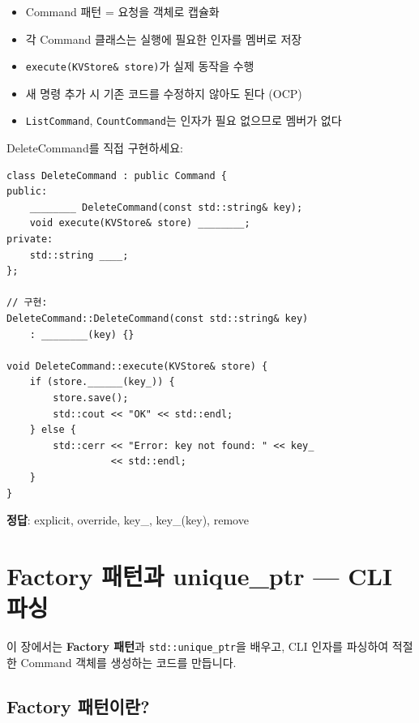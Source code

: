 \documentclass[11pt,a4paper]{book}
\newcommand{\code}[1]{\texttt{#1}}
\begin{document}
\begin{summarybox}
\begin{itemize}[nosep]
\item Command 패턴 = 요청을 객체로 캡슐화
\item 각 Command 클래스는 실행에 필요한 인자를 멤버로 저장
\item \code{execute(KVStore\& store)}가 실제 동작을 수행
\item 새 명령 추가 시 기존 코드를 수정하지 않아도 된다 (OCP)
\item \code{ListCommand}, \code{CountCommand}는 인자가 필요 없으므로 멤버가 없다
\end{itemize}
\end{summarybox}

\begin{quizbox}
DeleteCommand를 직접 구현하세요:

\begin{lstlisting}[style=cpp,numbers=none]
class DeleteCommand : public Command {
public:
    ________ DeleteCommand(const std::string& key);
    void execute(KVStore& store) ________;
private:
    std::string ____;
};

// 구현:
DeleteCommand::DeleteCommand(const std::string& key)
    : ________(key) {}

void DeleteCommand::execute(KVStore& store) {
    if (store.______(key_)) {
        store.save();
        std::cout << "OK" << std::endl;
    } else {
        std::cerr << "Error: key not found: " << key_
                  << std::endl;
    }
}
\end{lstlisting}

\textbf{정답}: explicit, override, key\_, key\_(key), remove
\end{quizbox}

\chapter{Factory 패턴과 unique\_ptr — CLI 파싱}
\label{ch:factory}

이 장에서는 \textbf{Factory 패턴}과 \code{std::unique\_ptr}을 배우고, CLI 인자를 파싱하여 적절한 Command 객체를 생성하는 코드를 만듭니다.

\section{Factory 패턴이란?}
\end{document}
